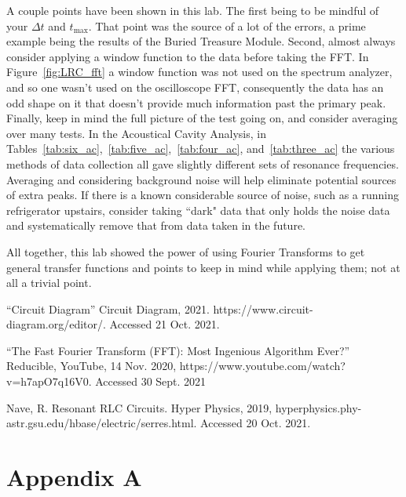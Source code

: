 \documentclass[12pt]{article}
\begin{document}
	A couple points have been shown in this lab. The first being to be mindful of your $\Delta t$ and $t_{\text{max}}$. That point was the source of a lot of the errors, a prime example being the results of the Buried Treasure Module. Second, almost always consider applying a window function to the data before taking the FFT. In Figure~\ref{fig:LRC_fft} a window function was not used on the spectrum analyzer, and so one wasn't used on the oscilloscope FFT, consequently the data has an odd shape on it that doesn't provide much information past the primary peak. Finally, keep in mind the full picture of the test going on, and consider averaging over many tests. In the Acoustical Cavity Analysis, in Tables~\ref{tab:six_ac},~\ref{tab:five_ac},~\ref{tab:four_ac}, and~\ref{tab:three_ac} the various methods of data collection all gave slightly different sets of resonance frequencies. Averaging and considering background noise will help eliminate potential sources of extra peaks. If there is a known considerable source of noise, such as a running refrigerator upstairs, consider taking ``dark" data that only holds the noise data and systematically remove that from data taken in the future. 
	
	All together, this lab showed the power of using Fourier Transforms to get general transfer functions and points to keep in mind while applying them; not at all a trivial point.
   
   
   
   


   
\begin{thebibliography}{1}
    
    
 “Circuit Diagram” Circuit Diagram, 2021. https://www.circuit-diagram.org/editor/. Accessed 21 Oct. 2021.
    
 “The Fast Fourier Transform (FFT): Most Ingenious Algorithm Ever?” Reducible, YouTube, 14 Nov. 2020, https://www.youtube.com/watch?v=h7apO7q16V0. Accessed 30 Sept. 2021

 Nave, R. Resonant RLC Circuits. Hyper Physics, 2019, hyperphysics.phy-astr.gsu.edu/hbase/electric/serres.html. Accessed 20 Oct. 2021.
‌
    
    
\end{thebibliography}
 
 
\newpage
\section*{Appendix A}
        
\end{document}
